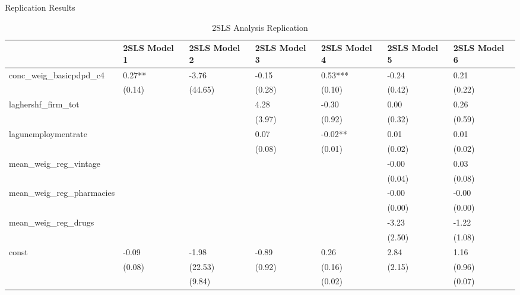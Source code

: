 \documentclass[final]{beamer}
\begin{document}
\begin{frame}[t]
\begin{columns}[T]
\begin{column}{.32\textwidth}
\begin{block}{\Huge Replication Results}
    \begin{table}
\tiny
\caption{2SLS Analysis Replication}
\label{}
\begin{center}
\begin{tabular}{lllllll}
\hline
                            & 2SLS Model 1 & 2SLS Model 2 & 2SLS Model 3 & 2SLS Model 4 & 2SLS Model 5 & 2SLS Model 6  \\
\hline
conc\_weig\_basicpdpd\_c4   & 0.27**       & -3.76        & -0.15        & 0.53***      & -0.24        & 0.21          \\
                            & (0.14)       & (44.65)      & (0.28)       & (0.10)       & (0.42)       & (0.22)        \\
laghershf\_firm\_tot        &              &              & 4.28         & -0.30        & 0.00         & 0.26          \\
                            &              &              & (3.97)       & (0.92)       & (0.32)       & (0.59)        \\
lagunemploymentrate         &              &              & 0.07         & -0.02**      & 0.01         & 0.01          \\
                            &              &              & (0.08)       & (0.01)       & (0.02)       & (0.02)        \\
mean\_weig\_reg\_vintage    &              &              &              &              & -0.00        & 0.03          \\
                            &              &              &              &              & (0.04)       & (0.08)        \\
mean\_weig\_reg\_pharmacies &              &              &              &              & -0.00        & -0.00         \\
                            &              &              &              &              & (0.00)       & (0.00)        \\
mean\_weig\_reg\_drugs      &              &              &              &              & -3.23        & -1.22         \\
                            &              &              &              &              & (2.50)       & (1.08)        \\
const                       & -0.09        & -1.98        & -0.89        & 0.26         & 2.84         & 1.16          \\
                            & (0.08)       & (22.53)      & (0.92)       & (0.16)       & (2.15)       & (0.96)        \\
       &              & (9.84)       &              & (0.02)       &              & (0.07)        \\


\end{tabular}
\end{center}
\end{table}
\end{block}
\end{column}
\end{columns}
\end{frame}
\end{document}
